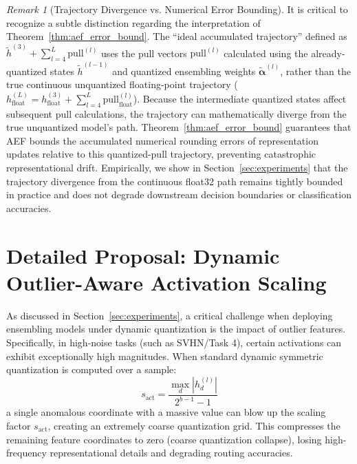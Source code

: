 \documentclass{article}
\theoremstyle{plain}
\theoremstyle{definition}
\theoremstyle{remark}
\newtheorem{remark}[theorem]{Remark}
\begin{document}
\begin{remark}[Trajectory Divergence vs. Numerical Error Bounding]\label{rem:trajectory_divergence}
It is critical to recognize a subtle distinction regarding the interpretation of Theorem~\ref{thm:aef_error_bound}. The ``ideal accumulated trajectory'' defined as $\tilde{h}^{(3)} + \sum_{l=4}^L \text{pull}^{(l)}$ uses the pull vectors $\text{pull}^{(l)}$ calculated using the already-quantized states $\tilde{h}^{(l-1)}$ and quantized ensembling weights $\tilde{\boldsymbol{\alpha}}^{(l)}$, rather than the true continuous unquantized floating-point trajectory ($h^{(L)}_{\text{float}} = h^{(3)}_{\text{float}} + \sum_{l=4}^L \text{pull}^{(l)}_{\text{float}}$). Because the intermediate quantized states affect subsequent pull calculations, the trajectory can mathematically diverge from the true unquantized model's path. Theorem~\ref{thm:aef_error_bound} guarantees that AEF bounds the accumulated numerical rounding errors of representation updates relative to this quantized-pull trajectory, preventing catastrophic representational drift. Empirically, we show in Section~\ref{sec:experiments} that the trajectory divergence from the continuous float32 path remains tightly bounded in practice and does not degrade downstream decision boundaries or classification accuracies.
\end{remark}

\section{Detailed Proposal: Dynamic Outlier-Aware Activation Scaling}
\label{app:outlier_scaling}

As discussed in Section~\ref{sec:experiments}, a critical challenge when deploying ensembling models under dynamic quantization is the impact of outlier features. Specifically, in high-noise tasks (such as SVHN/Task 4), certain activations can exhibit exceptionally high magnitudes. When standard dynamic symmetric quantization is computed over a sample:
\begin{equation}
    s_{\text{act}} = \frac{\max_{d} |h_d^{(l)}|}{2^{b-1}-1}
\end{equation}
a single anomalous coordinate with a massive value can blow up the scaling factor $s_{\text{act}}$, creating an extremely coarse quantization grid. This compresses the remaining feature coordinates to zero (coarse quantization collapse), losing high-frequency representational details and degrading routing accuracies.
\end{document}
